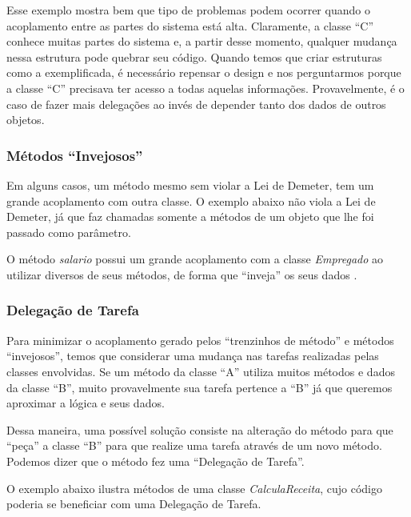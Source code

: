 Esse exemplo mostra bem que tipo de problemas podem ocorrer quando o acoplamento entre as partes do sistema está alta. Claramente, a 
classe ``C'' conhece muitas partes do sistema e, a partir desse momento, qualquer mudança nessa estrutura pode quebrar seu código. 
Quando temos que criar estruturas como a exemplificada, é necessário repensar o design e nos perguntarmos porque a classe ``C'' 
precisava ter acesso a todas aquelas informações. Provavelmente, é o caso de fazer mais delegações ao invés de depender tanto dos 
dados de outros objetos.

\subsubsection{Métodos ``Invejosos''}  
\label{classes:invejoso}
Em alguns casos, um método mesmo sem violar a Lei de Demeter, tem um grande acoplamento com outra classe.
O exemplo abaixo não viola a Lei de Demeter, já que faz chamadas somente a métodos de um objeto que lhe foi passado como parâmetro.



O método \textit{salario} possui um grande acoplamento com a classe \textit{Empregado} ao utilizar diversos de seus métodos, de forma 
que ``inveja'' os seus dados \citep{Fowler99}.

\subsubsection{Delegação de Tarefa}
Para minimizar o acoplamento gerado pelos ``trenzinhos de método'' e métodos ``invejosos'', temos que considerar uma mudança nas 
tarefas realizadas pelas classes envolvidas. Se um método da classe ``A'' utiliza muitos métodos e dados da classe ``B'', muito 
provavelmente sua tarefa pertence a ``B'' já que queremos aproximar a lógica e seus dados.

Dessa maneira, uma possível solução consiste na alteração do método para que ``peça'' a classe ``B'' para que realize uma tarefa 
através de um novo método. Podemos dizer que o método fez uma ``Delegação de Tarefa''.

O exemplo abaixo ilustra métodos de uma classe \textit{CalculaReceita}, cujo código poderia se beneficiar com uma Delegação de Tarefa.



